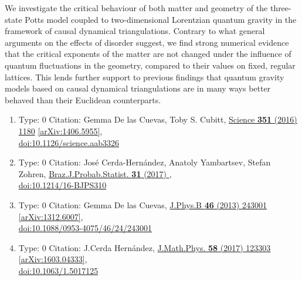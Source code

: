 \documentclass[a4paper,10pt]{article}
\begin{document}
\begin{enumerate}
We investigate the critical behaviour of both matter and geometry of the three-state Potts model coupled to two-dimensional Lorentzian quantum gravity in the framework of causal dynamical triangulations. Contrary to what general arguments on the effects of disorder suggest, we find strong numerical evidence that the critical exponents of the matter are not changed under the influence of quantum fluctuations in the geometry, compared to their values on fixed, regular lattices. This lends further support to previous findings that quantum gravity models based on causal dynamical triangulations are in many ways better behaved than their Euclidean counterparts.
\begin{enumerate}
  \item Type: 0 Citation: Gemma De las Cuevas, Toby S. Cubitt, \href{https://www.doi.org/10.1126/science.aab3326}{Science {\bf 351} (2016) 1180}  \href{https://arxiv.org/abs/1406.5955}{[arXiv:1406.5955]},\\\href{https://www.doi.org/10.1126/science.aab3326}{doi:10.1126/science.aab3326}
  \item Type: 0 Citation: José Cerda-Hernández, Anatoly Yambartsev, Stefan Zohren, \href{https://www.doi.org/10.1214/16-BJPS310}{Braz.J.Probab.Statist. {\bf 31} (2017) },\\\href{https://www.doi.org/10.1214/16-BJPS310}{doi:10.1214/16-BJPS310}
  \item Type: 0 Citation: Gemma De las Cuevas, \href{https://www.doi.org/10.1088/0953-4075/46/24/243001}{J.Phys.B {\bf 46} (2013) 243001}  \href{https://arxiv.org/abs/1312.6007}{[arXiv:1312.6007]},\\\href{https://www.doi.org/10.1088/0953-4075/46/24/243001}{doi:10.1088/0953-4075/46/24/243001}
  \item Type: 0 Citation: J.Cerda Hernández, \href{https://www.doi.org/10.1063/1.5017125}{J.Math.Phys. {\bf 58} (2017) 123303}  \href{https://arxiv.org/abs/1603.04333}{[arXiv:1603.04333]},\\\href{https://www.doi.org/10.1063/1.5017125}{doi:10.1063/1.5017125}

\end{enumerate}
\end{enumerate}
\end{document}

